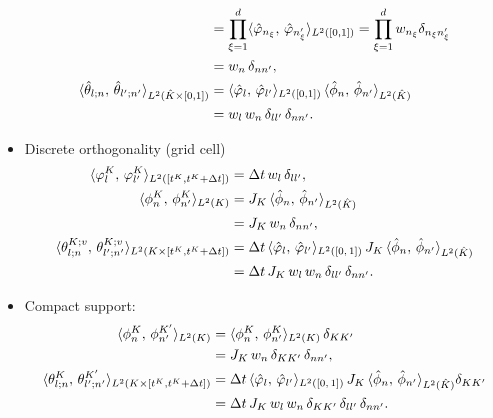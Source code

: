 \documentclass{scrreprt}
\theoremstyle{definition}
\theoremstyle{nonumberplain}
\newcommand{\cell}{K}
\newcommand{\refCell}{\hat{\cell}}
\newcommand{\detJ}{J_\cell}
\begin{document}
\begin{itemize}
\begin{align}
&= \prod_{\xi=1}^d
\langle \hat{\varphi}_{n_\xi},\,\hat{\varphi}_{n'_\xi}\rangle_{L^2([0,1])}
=
\prod_{\xi=1}^{d}
w_{n_\xi}
\delta_{n_\xi n'_\xi}\notag
\\
&=
w_{n}
\,\delta_{n n'}
,
\\
\langle\hat{\theta}_{l;n},\,\hat{\theta}_{l';n'}\rangle
_{L^2(\refCell\times[0,1])}
&=
\langle \hat{\varphi}_{l},\,\hat{\varphi}_{l'}\rangle_{L^2([0,1])}
\,
\langle \hat{\phi}_{n},\,\hat{\phi}_{n'}\rangle_{L^2(\refCell)}\notag
\\
&= w_{l}\,w_{n}\,
\delta_{l l'}\,\delta_{n n'}.
\end{align}
\item Discrete orthogonality (grid cell)
\begin{align}
\langle \varphi^\cell_{l},\,\varphi^\cell_{l'}\rangle_{L^2([t^K,t^K+\Delta
t])} &= \Delta t\,w_l\,\delta_{ll'},
\\
\label{eq:ader_impl:basis:discrete_ortho_grid_3d}
\langle \phi^\cell_{n},\,\phi^\cell_{n'}\rangle_{L^2(\cell)}
&=
\detJ\,\langle \hat{\phi}_{n},\,\hat{\phi}_{n'}\rangle_{L^2(\refCell)}\notag
\\
&=
\detJ\,
w_{n}\,
\delta_{n n'},
\\
\langle\theta^{K;v}_{l;n},\,\theta^{K;v}_{l';n'}\rangle
_{L^2(\cell\times[t^K,t^K+\Delta t])}
&=
\Delta t\,
\langle \hat{\varphi}_{l},\,\hat{\varphi}_{l'}\rangle_{L^2([0,\,1])}
\,
\detJ\,
\langle \hat{\phi}_{n},\,\hat{\phi}_{n'}\rangle_{L^2(\refCell)}\notag
\\
&= \Delta t\,\detJ\,w_{l}\,w_{n}\,\delta_{l l'}\,\delta_{n n'}.
\end{align}
\item Compact support:
\begin{align}
\langle \phi^{\cell}_{n},\,\phi^{\cell'}_{n'}\rangle_{L^2(\cell)}
&=
\langle \phi^{\cell}_{n},\,\phi^{\cell}_{n'}\rangle_{L^2(\cell)}
\,\delta_{\cell\cell'}
\notag
\\
&=
\detJ\,
w_{n}\,
\delta_{\cell\cell'}\,
\delta_{n n'},
\\
\langle\theta^{\cell}_{l;n},\,\theta^{\cell'}_{l';n'}\rangle
_{L^2(\cell\times[t^\cell,t^\cell+\Delta t])}
&=
\Delta t\,
\langle \hat{\varphi}_{l},\,\hat{\varphi}_{l'}\rangle_{L^2([0,\,1])}
\,
\detJ\,
\langle \hat{\phi}_{n},\,\hat{\phi}_{n'}\rangle_{L^2(\refCell)}
\delta_{\cell\cell'}
\notag
\\
&=
\Delta t\,\detJ\,w_{l}\,w_{n}\,
\delta_{\cell\cell'}\,\delta_{l l'}\,\delta_{n n'}.
\end{align}

\end{itemize}
\end{document}
